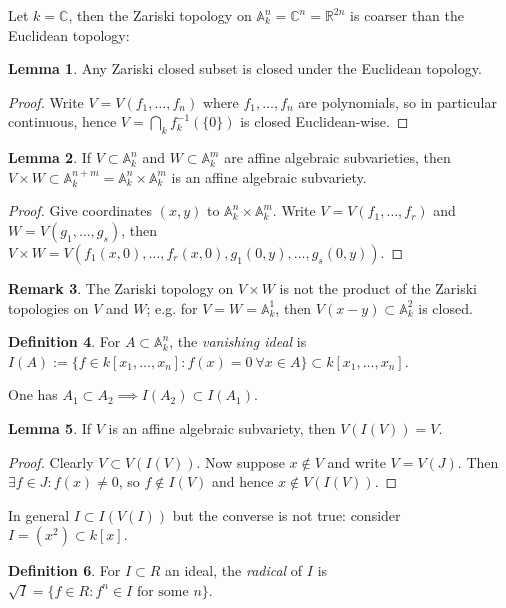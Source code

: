 \documentclass{article}
\newcommand{\R}{\mathbb{R}}
\newcommand{\C}{\mathbb{C}}
\newcommand{\A}{\mathbb{A}}
\theoremstyle{definition}
\newtheorem{defn}{Definition}[subsection]
\newtheorem{lemma}[defn]{Lemma}
\newtheorem{remark}[defn]{Remark}
\begin{document}
Let $k=\C$, then the Zariski topology on $\A_k^n=\C^n=\R^{2n}$ is coarser than the Euclidean topology:

\begin{lemma}
Any Zariski closed subset is closed under the Euclidean topology.
\end{lemma}
\begin{proof}
Write $V=V(f_1,\ldots,f_n)$ where $f_1,\ldots,f_n$ are polynomials, so in particular continuous, hence $V=\bigcap_k f_k^{-1}(\{0\})$ is closed Euclidean-wise.
\end{proof}

\begin{lemma}
If $V\subset\A_k^n$ and $W\subset\A_k^m$ are affine algebraic subvarieties, then $V\times W\subset\A_k^{n+m}=\A_k^n\times\A_k^m$ is an affine algebraic subvariety.
\end{lemma}
\begin{proof}
Give coordinates $(x,y)$ to $\A_k^n\times\A_k^m$. Write $V=V(f_1,\ldots,f_r)$ and $W=V(g_1,\ldots,g_s)$, then $V\times W=V(f_1(x,0),\ldots,f_r(x,0),g_1(0,y),\ldots,g_s(0,y))$.
\end{proof}

\begin{remark}
The Zariski topology on $V\times W$ is not the product of the Zariski topologies on $V$ and $W$; e.g. for $V=W=\A_k^1$, then $V(x-y)\subset\A_k^2$ is closed.
\end{remark}

\begin{defn}
For $A\subset\A_k^n$, the \textit{vanishing ideal} is $I(A):=\{f\in k[x_1,\ldots,x_n]:f(x)=0 \ \forall x\in A\}\subset k[x_1,\ldots,x_n]$.
\end{defn}

One has $A_1\subset A_2\implies I(A_2)\subset I(A_1)$.

\begin{lemma}
If $V$ is an affine algebraic subvariety, then $V(I(V))=V$.
\end{lemma}
\begin{proof}
Clearly $V\subset V(I(V))$. Now suppose $x\notin V$ and write $V=V(J)$. Then $\exists f\in J:f(x)\neq 0$, so $f\notin I(V)$ and hence $x\notin V(I(V))$.
\end{proof}

In general $I\subset I(V(I))$ but the converse is not true: consider $I=(x^2)\subset k[x]$.

\begin{defn}
For $I\subset R$ an ideal, the \textit{radical} of $I$ is $\sqrt I=\{f\in R:f^n\in I\text{ for some }n\}$.
\end{defn}
\end{document}
